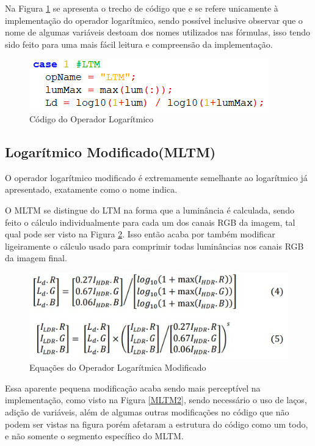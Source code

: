 \documentclass[conference]{IEEEtran}
\begin{document}
Na Figura \ref{LTM2} se apresenta o trecho de código que e se refere unicamente à implementação do operador logarítmico, sendo possível inclusive observar que o nome de algumas variáveis destoam dos nomes utilizados nas fórmulas, isso tendo sido feito para uma mais fácil leitura e compreensão da implementação.

\begin{figure}[!htpb]
    \centering
    \includegraphics[scale=.40]{Imagens/ltmcod2.png}
    \caption{Código do Operador Logarítmico}
    \label{LTM2}
\end{figure}

\subsection{Logarítmico Modificado(MLTM)}

O operador logarítmico modificado é extremamente semelhante ao logarítmico já apresentado, exatamente como o nome indica.

O MLTM se distingue do LTM na forma que a luminância é calculada, sendo feito o cálculo individualmente para cada um dos canais RGB da imagem, tal qual pode ser visto na Figura \ref{MLTM}. Isso então acaba por também modificar ligeiramente o cálculo usado para comprimir todas luminâncias nos canais RGB da imagem final.

\begin{figure}[!htpb]
    \centering
    \includegraphics[scale=.40]{Imagens/logm.jpg}
    \caption{Equações do Operador Logarítmica Modificado}
    \label{MLTM}
\end{figure}

Essa aparente pequena modificação acaba sendo mais perceptível na implementação, como visto na Figura \ref{MLTM2}, sendo necessário o uso de laços, adição de variáveis, além de algumas outras modificações no código que não podem ser vistas na figura porém afetaram a estrutura do código como um todo, e não somente o segmento específico do MLTM.
\end{document}
